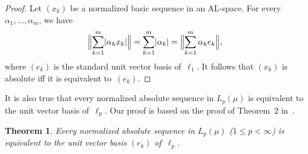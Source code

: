 \documentclass[12pt]{amsart}
\theoremstyle{plain}
\newtheorem{theorem}{Theorem}[section]
\theoremstyle{definition}
\newcommand{\abs}[1]{\lvert#1\rvert}
\newcommand{\Bignorm}[1]{\Bigl\lVert#1\Bigr\rVert}
\renewcommand{\le}{\leqslant}
\begin{document}
\begin{proof}
  Let $(x_k)$ be a normalized basic sequence in an AL-space. For
  every $\alpha_1,\dots,\alpha_m$, we have
  \begin{displaymath}
  \Bignorm{\sum_{k=1}^m\abs{\alpha_kx_k}}
  =\sum_{k=1}^m\abs{\alpha_k}
  =\Bignorm{\sum_{k=1}^m\alpha_ke_k},
  \end{displaymath}
  where $(e_k)$ is the standard unit vector basis of~$\ell_1$. It
  follows  that $(x_k)$ is absolute iff it is
  equivalent to~$(e_k)$.
\end{proof}

It is also true that every normalized
absolute sequence in $L_p(\mu)$ is equivalent to the unit vector basis
of~$\ell_p$. Our proof is based on the proof of Theorem~2
in~\cite{Johnson:15}. 

\begin{theorem}\label{abs-Lp}
  Every normalized absolute sequence in $L_p(\mu)$ ($1\le p<\infty$)
  is equivalent to the unit vector basis $(e_k)$ of~$\ell_p$.
\end{theorem}
\end{document}
